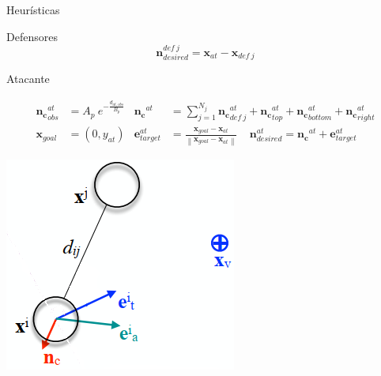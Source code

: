 \begin{frame}{Heurísticas}
    \begin{block}{Defensores}
        \footnotesize{}
        \begin{equation*}
            \mathbf{n}_{desired}^{def\ j} = \mathbf{x}_{at} - \mathbf{x}_{def\ j}
        \end{equation*}
    \end{block}
    \begin{block}{Atacante}
        \footnotesize{
        }
        \begin{minipage}{0.75\linewidth}
            \begin{equation*}
                \begin{aligned}
                    \mathbf{n_c}_{obs}^{at} &= A_p\ e^{-\frac{d_{at,obs}}{B_p}} & \mathbf{n_c}^{at} &= \sum_{j=1}^{N_j} \mathbf{n_c}_{def\ j}^{at} + \mathbf{n_c}_{top}^{at} + \mathbf{n_c}_{bottom}^{at} + \mathbf{n_c}_{right}^{at} \\
                    \mathbf{x}_{goal} &= (0, y_{at}) & \mathbf{e}_{target}^{at} &= \frac{\mathbf{x}_{goal} - \mathbf{x}_{at}}{\left\| \mathbf{x}_{goal} - \mathbf{x}_{at} \right\|}\ \ \ \ \ \mathbf{n}_{desired}^{at} = \mathbf{n_c}^{at} + \mathbf{e}_{target}^{at}
                \end{aligned}
            \end{equation*}
        \end{minipage}
        \begin{minipage}{0.2\linewidth}
            \includegraphics[width=\textwidth]{pic/01-introduccion/cpm-modified}
        \end{minipage}
    \end{block}
\end{frame}

